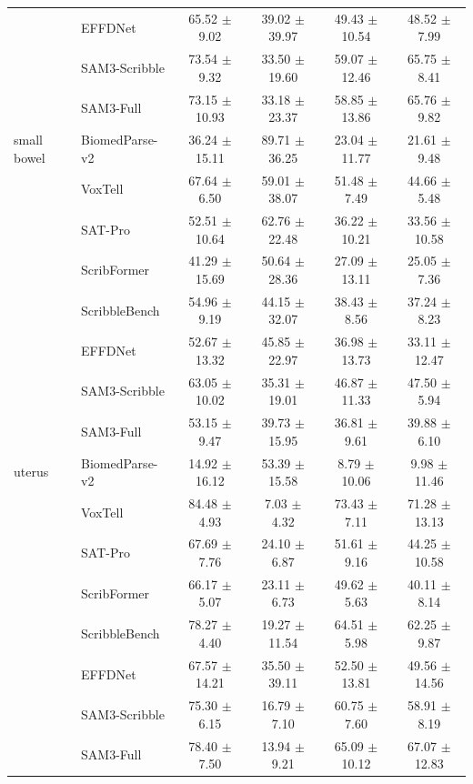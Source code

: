 \begin{table}[!p]
{\begin{tabular}{l l c c c c}
 & EFFDNet & 65.52 $\pm$ 9.02 & 39.02 $\pm$ 39.97 & 49.43 $\pm$ 10.54 & 48.52 $\pm$ 7.99 \\
 & SAM3-Scribble & 73.54 $\pm$ 9.32 & 33.50 $\pm$ 19.60 & 59.07 $\pm$ 12.46 & 65.75 $\pm$ 8.41 \\
 & SAM3-Full & 73.15 $\pm$ 10.93 & 33.18 $\pm$ 23.37 & 58.85 $\pm$ 13.86 & 65.76 $\pm$ 9.82 \\
small bowel & BiomedParse-v2 & \cellcolor{gray!20}36.24 $\pm$ 15.11 & \cellcolor{gray!20}89.71 $\pm$ 36.25 & \cellcolor{gray!20}23.04 $\pm$ 11.77 & \cellcolor{gray!20}21.61 $\pm$ 9.48 \\
 & VoxTell & \cellcolor{gray!20}67.64 $\pm$ 6.50 & \cellcolor{gray!20}59.01 $\pm$ 38.07 & \cellcolor{gray!20}51.48 $\pm$ 7.49 & \cellcolor{gray!20}44.66 $\pm$ 5.48 \\
 & SAT-Pro & 52.51 $\pm$ 10.64 & 62.76 $\pm$ 22.48 & 36.22 $\pm$ 10.21 & 33.56 $\pm$ 10.58 \\
 & ScribFormer & 41.29 $\pm$ 15.69 & 50.64 $\pm$ 28.36 & 27.09 $\pm$ 13.11 & 25.05 $\pm$ 7.36 \\
 & ScribbleBench & 54.96 $\pm$ 9.19 & 44.15 $\pm$ 32.07 & 38.43 $\pm$ 8.56 & 37.24 $\pm$ 8.23 \\
 & EFFDNet & 52.67 $\pm$ 13.32 & 45.85 $\pm$ 22.97 & 36.98 $\pm$ 13.73 & 33.11 $\pm$ 12.47 \\
 & SAM3-Scribble & 63.05 $\pm$ 10.02 & 35.31 $\pm$ 19.01 & 46.87 $\pm$ 11.33 & 47.50 $\pm$ 5.94 \\
 & SAM3-Full & 53.15 $\pm$ 9.47 & 39.73 $\pm$ 15.95 & 36.81 $\pm$ 9.61 & 39.88 $\pm$ 6.10 \\
uterus & BiomedParse-v2 & \cellcolor{gray!20}14.92 $\pm$ 16.12 & \cellcolor{gray!20}53.39 $\pm$ 15.58 & \cellcolor{gray!20}8.79 $\pm$ 10.06 & \cellcolor{gray!20}9.98 $\pm$ 11.46 \\
 & VoxTell & \cellcolor{gray!20}84.48 $\pm$ 4.93 & \cellcolor{gray!20}7.03 $\pm$ 4.32 & \cellcolor{gray!20}73.43 $\pm$ 7.11 & \cellcolor{gray!20}71.28 $\pm$ 13.13 \\
 & SAT-Pro & 67.69 $\pm$ 7.76 & 24.10 $\pm$ 6.87 & 51.61 $\pm$ 9.16 & 44.25 $\pm$ 10.58 \\
 & ScribFormer & 66.17 $\pm$ 5.07 & 23.11 $\pm$ 6.73 & 49.62 $\pm$ 5.63 & 40.11 $\pm$ 8.14 \\
 & ScribbleBench & 78.27 $\pm$ 4.40 & 19.27 $\pm$ 11.54 & 64.51 $\pm$ 5.98 & 62.25 $\pm$ 9.87 \\
 & EFFDNet & 67.57 $\pm$ 14.21 & 35.50 $\pm$ 39.11 & 52.50 $\pm$ 13.81 & 49.56 $\pm$ 14.56 \\
 & SAM3-Scribble & 75.30 $\pm$ 6.15 & 16.79 $\pm$ 7.10 & 60.75 $\pm$ 7.60 & 58.91 $\pm$ 8.19 \\
 & SAM3-Full & 78.40 $\pm$ 7.50 & 13.94 $\pm$ 9.21 & 65.09 $\pm$ 10.12 & 67.07 $\pm$ 12.83 \\
\bottomrule
\end{tabular}%
}
\end{table}

